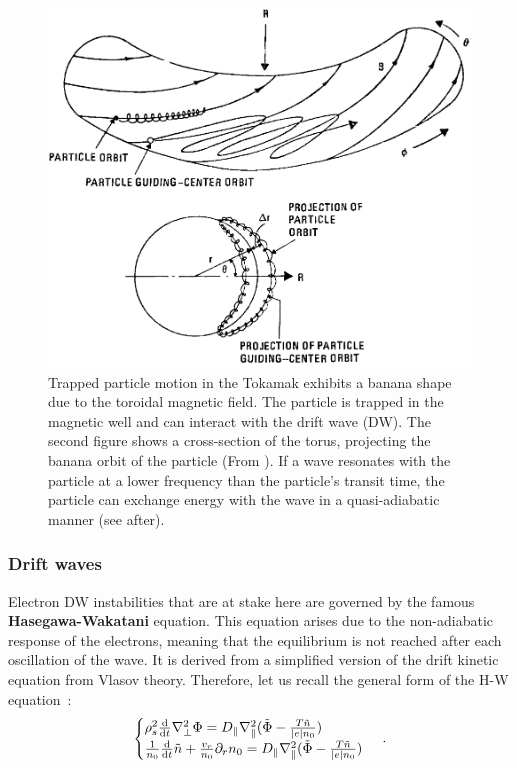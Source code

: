 \documentclass[11pt,a4paper,openany]{report}
\begin{document}
\begin{multicols}{2}

    \begin{figure}[H]
        \centering
        \includegraphics[width=1\linewidth]{./figures/banana.png}
        \caption{Trapped particle motion in the Tokamak exhibits a banana shape due to the toroidal magnetic field. The particle is trapped in the magnetic well and can interact with the drift wave (DW). The second figure shows a cross-section of the torus, projecting the banana orbit of the particle (From \cite{book_banana, Banana_distr_runaway}). If a wave resonates with the particle at a lower frequency than the particle's transit time, the particle can exchange energy with the wave in a quasi-adiabatic manner (see after).}
        \label{}
    \end{figure}


    \subsubsection{Drift waves}
    Electron DW instabilities that are at stake here are governed by the famous \textbf{Hasegawa-Wakatani} \cite{Hasegawa,Wakatani} equation. This equation arises due to the non-adiabatic response of the electrons, meaning that the equilibrium is not reached after each oscillation of the wave. It is derived from a simplified version of the drift kinetic equation from Vlasov theory. Therefore, let us recall the general form of the H-W equation~:
    \begin{equation}
        \begin{cases}
            \rho_s^2
            \dv{t}\nabla_\perp^2 \Phi= D_\parallel\nabla_\parallel^2(\tilde{\Phi} - \frac{T\tilde{n}}{|e|n_0}) \\
            \frac{1}{n_0}\dv{t}\tilde{n} + \frac{v_r}{n_0}\partial_r n_0 = D_\parallel\nabla_\parallel^2(\tilde{\Phi} - \frac{T\tilde{n}}{|e|n_0})
        \end{cases}\,.
    \end{equation}


\end{multicols}
\end{document}
